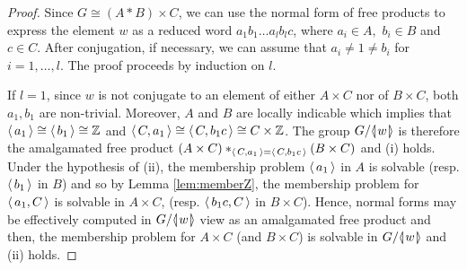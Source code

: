 \documentclass[12pt, a4paper]{amsart}
\theoremstyle{remark}
\theoremstyle{definition}
\begin{document}
\begin{proof}

Since $G\cong (A*B)\times C$, we can use the normal form of free products to express the element $w$  as a reduced word $a_1b_1\dots a_lb_lc$, where $a_i\in A,$  $b_i\in B$ and $c\in C$.  After conjugation, if necessary, we can assume that $a_i\neq 1\neq b_i$ for $i=1,\dots, l$. The proof proceeds by induction on $l$.

If $l=1$, since $w$ is not conjugate to an element of either $A\times C$ nor of $B\times C$, both $a_1, b_1$ are non-trivial. Moreover, $A$ and $B$ are locally indicable which implies that ${\langle\mkern3mu{a_1}\mkern3mu\rangle}\cong{\langle\mkern3mu{b_1}\mkern3mu\rangle}\cong{\mathbb{Z}}$ and ${\langle\mkern3mu{C,a_1}\mkern3mu\rangle}\cong {\langle\mkern3mu{C,b_1c}\mkern3mu\rangle}\cong C\times {\mathbb{Z}}$. The group $G/{{\langle}{\mkern-3.7mu}{\lvert}{\mkern1.2mu}{{w}}{\mkern1.2mu}{\rvert}{\mkern-3.7mu}{\rangle}}$ is therefore the amalgamated free product $(A\times C)*_{{\langle\mkern3mu{C,a_1}\mkern3mu\rangle}={\langle\mkern3mu{C,b_1c}\mkern3mu\rangle}}(B\times C)$ and (i) holds. Under the hypothesis of (ii), the membership problem ${\langle\mkern3mu{a_1}\mkern3mu\rangle}$ in $A$ is solvable (resp. ${\langle\mkern3mu{b_1}\mkern3mu\rangle}$ in $B$) and so by Lemma \ref{lem:memberZ}, the membership problem for ${\langle\mkern3mu{a_1, C}\mkern3mu\rangle}$ is solvable in $A\times C$, (resp. ${\langle\mkern3mu{b_1c, C}\mkern3mu\rangle}$ in $B\times C$). Hence, normal forms may be effectively computed in $G/{{\langle}{\mkern-3.7mu}{\lvert}{\mkern1.2mu}{{w}}{\mkern1.2mu}{\rvert}{\mkern-3.7mu}{\rangle}}$ view as an amalgamated free product and then, the membership problem for $A\times C$ (and $B\times C$) is solvable in $G/{{\langle}{\mkern-3.7mu}{\lvert}{\mkern1.2mu}{{w}}{\mkern1.2mu}{\rvert}{\mkern-3.7mu}{\rangle}}$ and (ii) holds. 


\end{proof}
\end{document}
